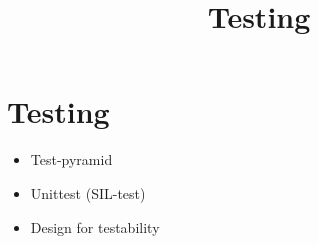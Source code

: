 

\title{Testing}



\section{Testing}

\begin{frame}
\begin{itemize}
  \item Test-pyramid
  \item Unittest (SIL-test)
  \item Design for testability
\end{itemize}

\end{frame}


